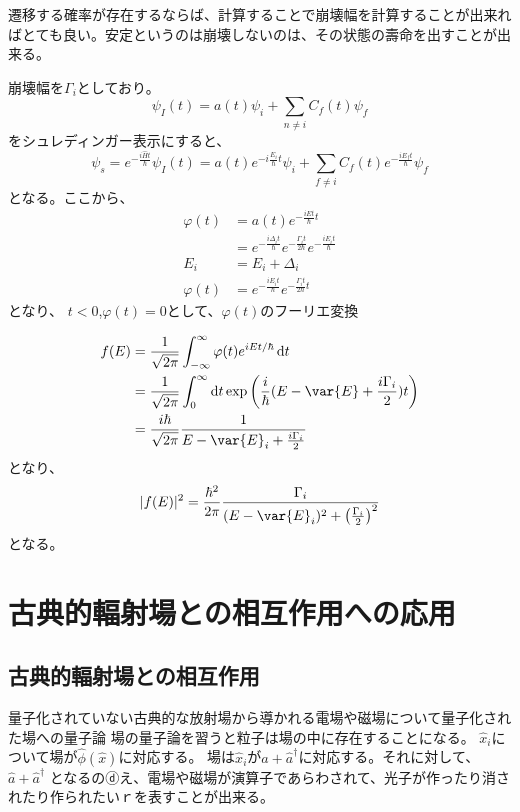 \documentclass[titlepage]{ltjsarticle}
\begin{document}
遷移する確率が存在するならば、計算することで崩壊幅を計算することが出来ればとても良い。安定というのは崩壊しないのは、その状態の壽命を出すことが出来る。

崩壊幅を\(\Gamma_i\)としており。
\begin{equation}
  \psi_I (t) = a(t) \psi_i + \sum_{n\ne i} C_f(t) \psi_f
\end{equation}
をシュレディンガー表示にすると、
\begin{equation}
  \psi_s = e^{-\frac{i \hat{H}t}{\hbar}}\psi_I(t) = a(t) e^{- i \frac{E_i }{\hbar} t}\psi_i + \sum_{f \ne i} C_f(t)e^{-\frac{iE_f t}{\hbar}}\psi_f  
\end{equation}
となる。ここから、
\begin{align}
  \varphi(t) & = a(t) e^{-\frac{iE t}{\hbar}t} \\
  & = e^{-\frac{i \varDelta_i t }{\hbar}} e^{-\frac{\Gamma_i t}{2 \hbar}}e^{-\frac{iE_i t}{\hbar}}\\
  E_i & = E_i + \varDelta_i \\
  \varphi(t) & = e^{-\frac{iE_i t}{\hbar}} e^{-\frac{\Gamma_i t}{2 \hbar}t}
\end{align}
となり、
\(t<0\),\(\varphi(t)=0\)として、\(\varphi(t)\)のフーリエ変換

\begin{align}
  f(E) & = \frac{1}{\sqrt{2\pi}}\int_{-\infty }^{\infty} \varphi(t) e^{iEt/\hbar} \odif{t}\\
  & = \frac{1}{\sqrt{2\pi}}\int^{\infty}_{0}\odif{t} \exp\left( \frac{i }{\hbar}(E-\var{E}+\frac{i \Gamma_{i}}{2})t \right)\\
  & = \frac{i \hbar}{\sqrt{2\pi}}\frac{1}{E-\var{E}_i +\frac{i \Gamma_i}{2}}
\end{align}
となり、
\begin{equation}
  |f(E)|^2 = \frac{\hbar^2}{2\pi} \frac{\Gamma_i}{(E-\var{E}_i)^2 + \left( \frac{\Gamma_i}{2} \right)^2}
\end{equation}
となる。


\section{古典的輻射場との相互作用への応用}
\subsection{古典的輻射場との相互作用}
量子化されていない古典的な放射場から導かれる電場や磁場について量子化された場への量子論
場の量子論を習うと粒子は場の中に存在することになる。
\(\hat{x}_i\)について場が\(\hat{\phi}(\hat{x})\)に対応する。
場は\(\hat{x}_i\)が\(\hat{a} + \hat{a}^\dagger\)に対応する。それに対して、\(\hat{a}+\hat{a}^\dagger\)
となるのⓓえ、電場や磁場が演算子であらわされて、光子が作ったり消されたり作られたいｒを表すことが出来る。
\end{document}
